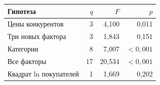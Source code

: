\begin{tabular}{lrrr}
\toprule
Гипотеза & $q$ & $F$ & $p$ \\
\midrule
Цены конкурентов & 3 & 4,100 & 0,011 \\
Три новых фактора & 3 & 1,843 & 0,151 \\
Категории & 8 & 7,007 & $<0{,}001$ \\
Все факторы & 17 & 20,534 & $<0{,}001$ \\
Квадрат ln покупателей & 1 & 1,669 & 0,202 \\
\bottomrule
\end{tabular}
